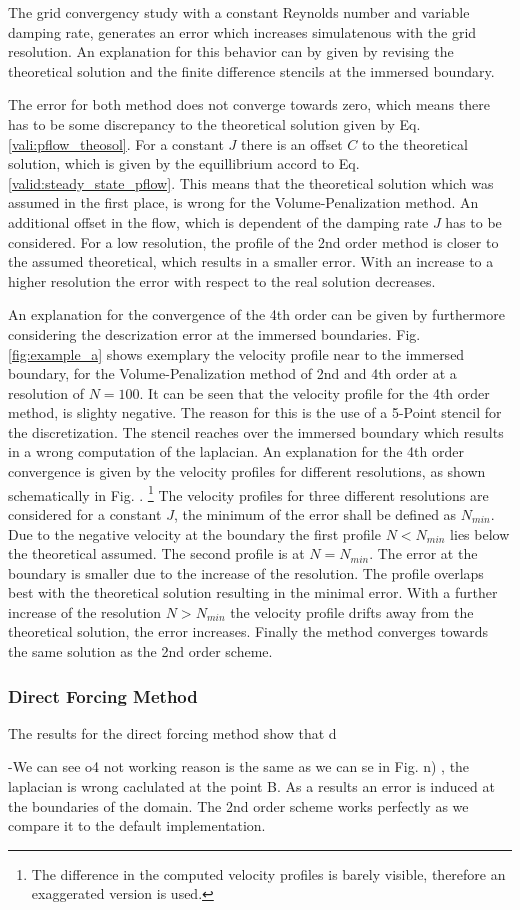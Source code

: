 The grid convergency study with a constant Reynolds number and variable damping rate, generates an error
which increases simulatenous with the grid resolution.
An explanation for this behavior can by given by revising the theoretical solution
and the finite difference stencils at the immersed boundary.

The error for both method does not converge towards zero, which means there has to be some discrepancy to the theoretical solution given by
Eq. \ref{vali:pflow_theosol}.
For a constant $J$ there is an offset $C$ to the theoretical solution,
which is given by the equillibrium accord to Eq.  \ref{valid:steady_state_pflow}.
This means that the theoretical solution which was assumed in the first place, is wrong for the Volume-Penalization method.
An additional offset in the flow, which is dependent of the damping rate $J$ has to be considered.
For a low resolution, the profile of the 2nd order method is closer to the assumed theoretical, which results in a smaller
error. With an increase to a higher resolution the error with respect to the real solution decreases.

An explanation for the convergence of the 4th order can be given by furthermore considering the descrization error at the immersed boundaries.
Fig. \ref{fig:example_a} shows exemplary the velocity profile near to the immersed boundary, for the Volume-Penalization method of 2nd and 4th order
at a resolution of $N=100$.
It can be seen that the velocity profile for the 4th order method, is slighty negative.
The reason for this is the use of a 5-Point stencil for the discretization.
The stencil reaches over the immersed boundary which results in a wrong computation of the laplacian.
An explanation for the 4th order convergence is given by the velocity profiles for different resolutions,
as shown schematically in Fig. \label{fig:example_b}.
\footnote{The difference in the computed velocity profiles is barely visible, therefore an exaggerated version is used.}
The velocity profiles for three different resolutions are considered for a constant $J$,
the minimum of the error shall be defined as $N_{min}$.
Due to the negative velocity at the boundary the first profile $N<N_{min}$ lies below the theoretical assumed.
The second profile is at $N=N_{min}$. The error at the boundary is smaller due to the increase of the resolution.
The profile overlaps best with the theoretical solution resulting in the minimal error.
With a further increase of the resolution  $N>N_{min}$ the velocity profile drifts away from the theoretical solution,
the error increases.  Finally the method converges towards the same solution as the 2nd order scheme.


\subsubsection{Direct Forcing Method}

The results for the direct forcing method show that d


-We can see o4 not working reason is the same as we can se in Fig. n) , the laplacian is wrong caclulated at the point B.
As a results an error is induced at the boundaries of the domain.
The 2nd order scheme works perfectly as we compare it to the default implementation.

